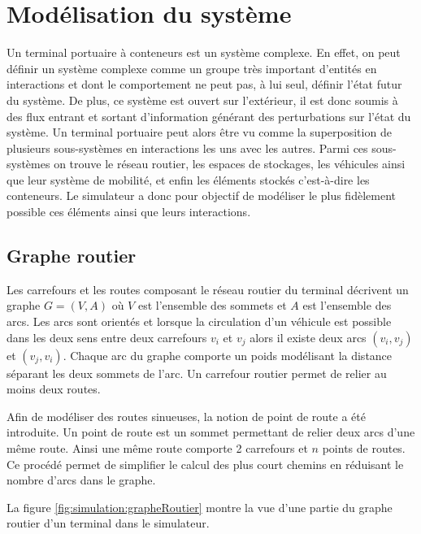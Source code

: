 

\section{Modélisation du système}

Un terminal portuaire à conteneurs est un système complexe. En effet, on peut définir un système complexe comme un groupe très important d'entités en interactions et dont le comportement ne peut pas, à lui seul, définir l'état futur du système. De plus, ce système est ouvert sur l'extérieur, il est donc soumis à des flux entrant et sortant d'information générant des perturbations sur l'état du système. Un terminal portuaire peut alors être vu comme la superposition de plusieurs sous-systèmes en interactions les uns avec les autres. Parmi ces sous-systèmes on trouve le réseau routier, les espaces de stockages, les véhicules ainsi que leur système de mobilité, et enfin les éléments stockés c'est-à-dire les conteneurs. Le simulateur a donc pour objectif de modéliser le plus fidèlement possible ces éléments ainsi que leurs interactions.

\subsection{Graphe routier}

Les carrefours et les routes composant le réseau routier du terminal décrivent un graphe $G=(V,A)$ où $V$ est l'ensemble des sommets et $A$ est l'ensemble des arcs. Les arcs sont orientés et lorsque la circulation d'un véhicule est possible dans les deux sens entre deux carrefours $v_i$ et $v_j$ alors il existe deux arcs $(v_i,v_j)$ et $(v_j,v_i)$. Chaque arc du graphe comporte un poids modélisant la distance séparant les deux sommets de l'arc. Un carrefour routier permet de relier au moins deux routes.

Afin de modéliser des routes sinueuses, la notion de point de route a été introduite. Un point de route est un sommet permettant de relier deux arcs d'une même route. Ainsi une même route comporte 2 carrefours et $n$ points de routes. Ce procédé permet de simplifier le calcul des plus court chemins en réduisant le nombre d'arcs dans le graphe.

La figure \ref{fig:simulation:grapheRoutier} montre la vue d'une partie du graphe routier d'un terminal dans le simulateur.

